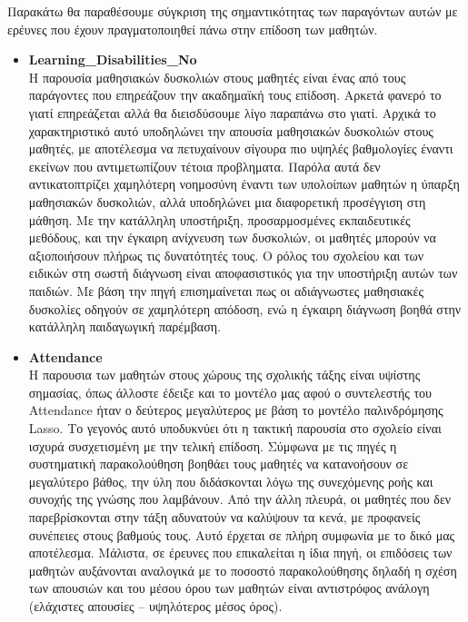 \documentclass[12pt]{article}
\begin{document}
Παρακάτω θα παραθέσουμε σύγκριση της σημαντικότητας των παραγόντων αυτών με ερέυνες που έχουν πραγματοποιηθεί 
πάνω στην επίδοση των μαθητών.\\

\begin{itemize}
\item \textbf{Learning\_{Disabilities}\_{No}}\\
Η παρουσία μαθησιακών δυσκολιών στους μαθητές είναι ένας από τους παράγοντες που επηρεάζουν την ακαδημαϊκή τους επίδοση. Αρκετά φανερό το γιατί επηρεάζεται αλλά θα διεισδύσουμε λίγο παραπάνω στο γιατί.
Αρχικά το χαρακτηριστικό αυτό υποδηλώνει την απουσία μαθησιακών δυσκολιών στους μαθητές, με αποτέλεσμα να πετυχαίνουν σίγουρα πιο υψηλές βαθμολογίες έναντι εκείνων που αντιμετωπίζουν τέτοια προβληματα.
Παρόλα αυτά δεν αντικατοπτρίζει χαμηλότερη νοημοσύνη έναντι των υπολοίπων μαθητών η ύπαρξη μαθησιακών δυσκολιών, αλλά υποδηλώνει μια διαφορετική προσέγγιση στη μάθηση. 
Με την κατάλληλη υποστήριξη, προσαρμοσμένες εκπαιδευτικές μεθόδους, και την έγκαιρη ανίχνευση των δυσκολιών, οι μαθητές μπορούν να αξιοποιήσουν πλήρως τις δυνατότητές τους. 
Ο ρόλος του σχολείου και των ειδικών στη σωστή διάγνωση είναι αποφασιστικός για την υποστήριξη αυτών των παιδιών. Με βάση την πηγή επισημαίνεται πως οι αδιάγνωστες μαθησιακές δυσκολίες οδηγούν σε 
χαμηλότερη απόδοση, ενώ η έγκαιρη διάγνωση βοηθά στην κατάλληλη παιδαγωγική παρέμβαση.

\item \textbf{Attendance}\\
Η παρουσια των μαθητών στους χώρους της σχολικής τάξης είναι υψίστης σημασίας, όπως άλλοστε έδειξε και 
το μοντέλο μας αφού ο συντελεστής του Attendance ήταν ο δεύτερος μεγαλύτερος με βάση το μοντέλο παλινδρόμησης Lasso. 
Το γεγονός αυτό υποδυκνύει ότι η τακτική παρουσία στο σχολείο είναι ισχυρά συσχετισμένη με την τελική επίδοση.
Σύμφωνα με τις πηγές η συστηματική παρακολούθηση βοηθάει τους μαθητές να κατανοήσουν σε μεγαλύτερο βάθος,
την ύλη που διδάσκονται λόγω της συνεχόμενης ροής και συνοχής της γνώσης που λαμβάνουν. Από την άλλη πλευρά,
οι μαθητές που δεν παρεβρίσκονται στην τάξη αδυνατούν να καλύψουν τα κενά, με προφανείς συνέπειες στους βαθμούς τους.
Αυτό έρχεται σε πλήρη συμφωνία με το δικό μας αποτέλεσμα. Μάλιστα, σε έρευνες που επικαλείται η ίδια πηγή, 
οι επιδόσεις των μαθητών αυξάνονται αναλογικά με το ποσοστό παρακολούθησης δηλαδή η σχέση των απουσιών
και του μέσου όρου των μαθητών είναι αντιστρόφος ανάλογη (ελάχιστες απουσίες – υψηλότερος μέσος όρος).


\end{itemize}
\end{document}
